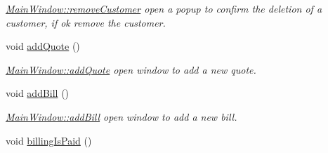 \begin{DoxyCompactItemize}
\begin{DoxyCompactList}\small\item\em \hyperlink{classGui_1_1MainWindow_ab86dd052f06fb56dbd77e3ae4c228796}{Main\-Window\-::remove\-Customer} open a popup to confirm the deletion of a customer, if ok remove the customer. \end{DoxyCompactList}\item 
void \hyperlink{classGui_1_1MainWindow_aa7d3f2553b55d74885ad7f19ed403dfd}{add\-Quote} ()
\begin{DoxyCompactList}\small\item\em \hyperlink{classGui_1_1MainWindow_aa7d3f2553b55d74885ad7f19ed403dfd}{Main\-Window\-::add\-Quote} open window to add a new quote. \end{DoxyCompactList}\item 
void \hyperlink{classGui_1_1MainWindow_a4b9d5d9bee4b7a5f7d8cfe04d1222315}{add\-Bill} ()
\begin{DoxyCompactList}\small\item\em \hyperlink{classGui_1_1MainWindow_a4b9d5d9bee4b7a5f7d8cfe04d1222315}{Main\-Window\-::add\-Bill} open window to add a new bill. \end{DoxyCompactList}\item 
\hypertarget{classGui_1_1MainWindow_a149c8e2210fa249c0510e1f607079fde}{void \hyperlink{classGui_1_1MainWindow_a149c8e2210fa249c0510e1f607079fde}{billing\-Is\-Paid} ()}\label{classGui_1_1MainWindow_a149c8e2210fa249c0510e1f607079fde}


\end{DoxyCompactItemize}

